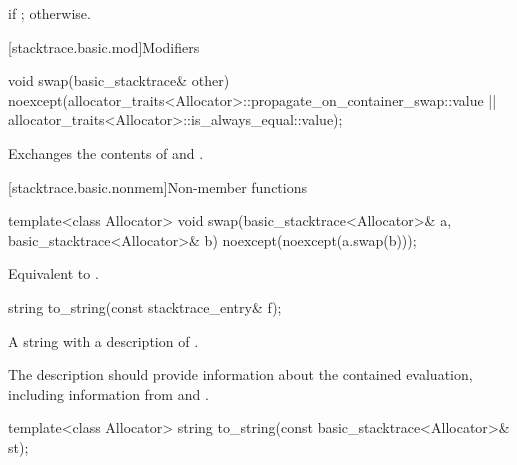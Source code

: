 \begin{itemdescr}
\pnum
\returns
{} if ;
otherwise.
\end{itemdescr}

[stacktrace.basic.mod]{Modifiers}

%
\begin{itemdecl}
void swap(basic_stacktrace& other)
  noexcept(allocator_traits<Allocator>::propagate_on_container_swap::value ||
    allocator_traits<Allocator>::is_always_equal::value);
\end{itemdecl}

\begin{itemdescr}
\pnum
\effects
Exchanges the contents of  and .
\end{itemdescr}

[stacktrace.basic.nonmem]{Non-member functions}

%
\begin{itemdecl}
template<class Allocator>
  void swap(basic_stacktrace<Allocator>& a, basic_stacktrace<Allocator>& b)
    noexcept(noexcept(a.swap(b)));
\end{itemdecl}

\begin{itemdescr}
\pnum
\effects
Equivalent to .
\end{itemdescr}

%
\begin{itemdecl}
string to_string(const stacktrace_entry& f);
\end{itemdecl}

\begin{itemdescr}
\pnum
\returns
A string with a description of .

\pnum
\recommended
The description should provide information about the contained evaluation,
including information from
 and .
\end{itemdescr}

%
\begin{itemdecl}
template<class Allocator>
  string to_string(const basic_stacktrace<Allocator>& st);
\end{itemdecl}

